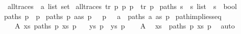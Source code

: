 \begin{isabellebody}
\isanewline
{}\isamarkupfalse%
\ all{\isacharunderscore}{\kern0pt}traces\ {\isacharcolon}{\kern0pt}{\isacharcolon}{\kern0pt}\ {\isachardoublequoteopen}{\isacharprime}{\kern0pt}a\ list\ set{\isachardoublequoteclose}\ \isanewline
{\isachardoublequoteopen}all{\isacharunderscore}{\kern0pt}traces\ {\isasymequiv}{\isacharbraceleft}{\kern0pt}tr{\isachardot}{\kern0pt}\ {\isasymexists}p\ p{\isacharprime}{\kern0pt}{\isachardot}{\kern0pt}\ p\ {\isasymmapsto}{\isachardollar}{\kern0pt}\ tr\ p{\isacharprime}{\kern0pt}{\isacharbraceright}{\kern0pt}{\isachardoublequoteclose}\isanewline
\isanewline
{}\isamarkupfalse%
\ paths{\isacharcolon}{\kern0pt}{\isacharcolon}{\kern0pt}\ {\isacartoucheopen}{\isacharprime}{\kern0pt}s\ {\isasymRightarrow}\ {\isacharprime}{\kern0pt}s\ list\ {\isasymRightarrow}\ {\isacharprime}{\kern0pt}s\ {\isasymRightarrow}\ bool{\isacartoucheclose}\ \isanewline
{\isacartoucheopen}paths\ p\ {\isacharbrackleft}{\kern0pt}{\isacharbrackright}{\kern0pt}\ p{\isacartoucheclose}\ {\isacharbar}{\kern0pt}\isanewline
{\isacartoucheopen}paths\ p\ {\isacharparenleft}{\kern0pt}a{\isacharhash}{\kern0pt}as{\isacharparenright}{\kern0pt}\ p{\isacharprime}{\kern0pt}{\isacharprime}{\kern0pt}{\isacartoucheclose}\ \ {\isachardoublequoteopen}{\isasymexists}{\isasymalpha}{\isachardot}{\kern0pt}\ p\ {\isasymmapsto}\ {\isasymalpha}\ a\ {\isasymand}\ {\isacharparenleft}{\kern0pt}paths\ a\ as\ p{\isacharprime}{\kern0pt}{\isacharprime}{\kern0pt}{\isacharparenright}{\kern0pt}{\isachardoublequoteclose}\isanewline
\isanewline
{}\isamarkupfalse%
\ path{\isacharunderscore}{\kern0pt}implies{\isacharunderscore}{\kern0pt}seq{\isacharcolon}{\kern0pt}\isanewline
\ \ \ A{}{\isacharcolon}{\kern0pt}\ {\isachardoublequoteopen}{\isasymexists}xs{\isachardot}{\kern0pt}\ paths\ p\ xs\ p{\isacharprime}{\kern0pt}{\isachardoublequoteclose}\isanewline
\ \ \ {\isachardoublequoteopen}{\isasymexists}ys{\isachardot}{\kern0pt}\ p\ {\isasymmapsto}{\isachardollar}{\kern0pt}\ ys\ p{\isacharprime}{\kern0pt}{\isachardoublequoteclose}\isanewline
%
\isadelimproof
%
\endisadelimproof
%
\isatagproof
{}\isamarkupfalse%
{\isacharminus}{\kern0pt}\isanewline
\ \ \isamarkupfalse%
\ A{}\ \isamarkupfalse%
\ xs\ \ {\isachardoublequoteopen}paths\ p\ xs\ p{\isacharprime}{\kern0pt}{\isachardoublequoteclose}\ \isamarkupfalse%
\ auto\isanewline
\ \ \isamarkupfalse%

\end{isabellebody}
